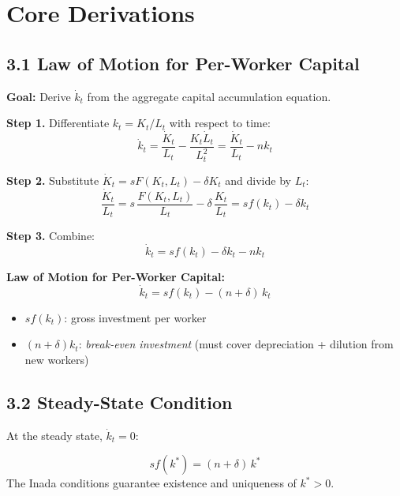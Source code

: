 \documentclass[a4paper,11pt]{article}
\begin{document}
\section{Core Derivations}

\subsection*{3.1 Law of Motion for Per-Worker Capital}

\begin{derivationbox}
\textbf{Goal:} Derive $\dot{k}_t$ from the aggregate capital accumulation equation.

\textbf{Step 1.} Differentiate $k_t = K_t / L_t$ with respect to time:
\[
\dot{k}_t = \frac{\dot{K}_t}{L_t} - \frac{K_t \dot{L}_t}{L_t^2} = \frac{\dot{K}_t}{L_t} - n k_t
\]

\textbf{Step 2.} Substitute $\dot{K}_t = sF(K_t,L_t) - \delta K_t$ and divide by $L_t$:
\[
\frac{\dot{K}_t}{L_t} = s\,\frac{F(K_t,L_t)}{L_t} - \delta\,\frac{K_t}{L_t} = sf(k_t) - \delta k_t
\]

\textbf{Step 3.} Combine:
\[
\dot{k}_t = sf(k_t) - \delta k_t - nk_t
\]
\end{derivationbox}

\begin{resultbox}
\textbf{Law of Motion for Per-Worker Capital:}
\[
\boxed{\dot{k}_t = sf(k_t) - (n+\delta)\,k_t}
\]
\begin{itemize}
    \item $sf(k_t)$: gross investment per worker
    \item $(n+\delta)k_t$: \emph{break-even investment} (must cover depreciation + dilution from new workers)
\end{itemize}
\end{resultbox}

\subsection*{3.2 Steady-State Condition}

At the steady state, $\dot{k}_t = 0$:

\begin{resultbox}
\[
\boxed{sf(k^*) = (n+\delta)\,k^*}
\]
The Inada conditions guarantee existence and uniqueness of $k^* > 0$.
\end{resultbox}
\end{document}
